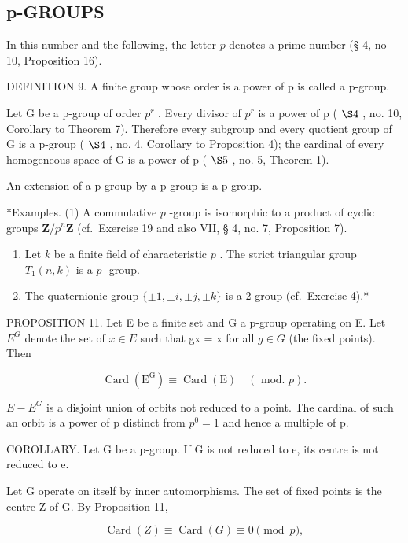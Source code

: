 \subsection{p-GROUPS}

In this number and the following, the letter \(p\) denotes a prime number (§ 4, no 10, Proposition 16).

DEFINITION 9. A finite group whose order is a power of p is called a p-group.

Let G be a p-group of order \(p^{r}\) . Every divisor of \(p^{r}\) is a power of p ( \(\S 4\) , no. 10, Corollary to Theorem 7). Therefore every subgroup and every quotient group of G is a p-group ( \(\S 4\) , no. 4, Corollary to Proposition 4); the cardinal of every homogeneous space of G is a power of p ( \(\S 5\) , no. 5, Theorem 1).

An extension of a p-group by a p-group is a p-group.

*Examples. (1) A commutative \(p\) -group is isomorphic to a product of cyclic groups \(\mathbf{Z} / p^n\mathbf{Z}\) (cf.~Exercise 19 and also VII, § 4, no. 7, Proposition 7).

\begin{enumerate}
\def\labelenumi{(\arabic{enumi})}
\setcounter{enumi}{1}
\item
  Let \(k\) be a finite field of characteristic \(p\) . The strict triangular group \(T_1(n, k)\) is a \(p\) -group.
\item
  The quaternionic group \(\{\pm 1, \pm i, \pm j, \pm k\}\) is a 2-group (cf.~Exercise 4).*
\end{enumerate}

PROPOSITION 11. Let E be a finite set and G a p-group operating on E. Let \(E^{G}\) denote the set of \(x \in E\) such that gx = x for all \(g \in G\) (the fixed points). Then

\[
\operatorname{Card} \left(\mathrm{E} ^ {\mathrm{G}}\right) \equiv \operatorname{Card} (\mathrm{E}) \quad (\text { mod. } p).
\]

\(E - E^{G}\) is a disjoint union of orbits not reduced to a point. The cardinal of such an orbit is a power of p distinct from \(p^{0} = 1\) and hence a multiple of p.

COROLLARY. Let G be a p-group. If G is not reduced to e, its centre is not reduced to e.

Let G operate on itself by inner automorphisms. The set of fixed points is the centre Z of G. By Proposition 11,

\[
\operatorname{Card} (Z) \equiv \operatorname{Card} (G) \equiv 0 \pmod {p},
\]

